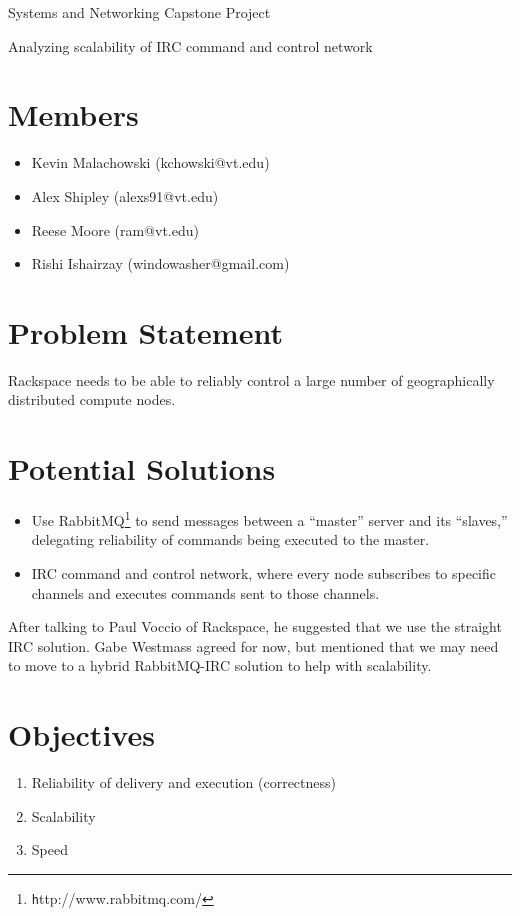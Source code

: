 \documentclass{article}
\begin{document}
\begin{center}
{\huge Systems and Networking Capstone Project}

{\large Analyzing scalability of IRC command and control network}
\end{center} 

\section*{Members}
\begin{itemize}
\item Kevin Malachowski (kchowski@vt.edu)
\item Alex Shipley (alexs91@vt.edu)
\item Reese Moore (ram@vt.edu)
\item Rishi Ishairzay (windowasher@gmail.com)
\end{itemize}

\section*{Problem Statement}

Rackspace needs to be able to reliably control a large number of geographically
distributed compute nodes.

\section*{Potential Solutions}
\begin{itemize}
\item Use RabbitMQ\footnote{\texttt http://www.rabbitmq.com/} to send messages
between a ``master'' server and its ``slaves,'' delegating reliability of commands
being executed to the master.
\item IRC command and control network, where every node subscribes to specific
channels and executes commands sent to those channels.
\end{itemize}

\noindent After talking to Paul Voccio of Rackspace, he suggested that we use the straight
IRC solution. Gabe Westmass agreed for now, but mentioned that we may need to
move to a hybrid RabbitMQ-IRC solution to help with scalability.

\section*{Objectives}
\begin{enumerate}
\item Reliability of delivery and execution (correctness)
\item Scalability
\item Speed
\end{enumerate}
\end{document}
